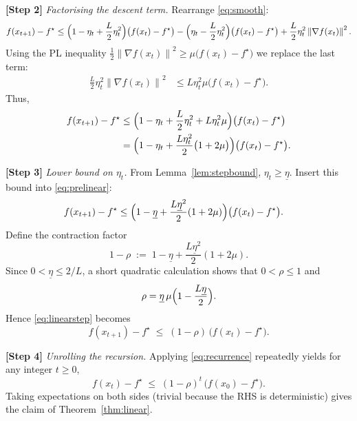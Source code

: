 \documentclass{article}
\newcommand{\norm}[1]{\left\lVert #1 \right\rVert}
\begin{document}
\noindent\textbf{[Step 2]} \emph{Factorising the descent term.}  
Rearrange \eqref{eq:smooth}:
\begin{equation}
f(x_{t+1})-f^{\star}
\le \Bigl(1-\eta_{t}+\frac{L}{2}\eta_{t}^{2}\Bigr)\bigl(f(x_{t})-f^{\star}\bigr)
    -\Bigl(\eta_{t}-\frac{L}{2}\eta_{t}^{2}\Bigr)
        \bigl(f(x_{t})-f^{\star}\bigr)
        +\frac{L}{2}\eta_{t}^{2}\norm{\nabla f(x_{t})}^{2}.
\end{equation}
Using the PL inequality $\frac12\norm{\nabla f(x_{t})}^{2}\ge\mu\bigl(f(x_{t})-f^{\star}\bigr)$ we replace the last term:
\begin{align}
\frac{L}{2}\eta_{t}^{2}\norm{\nabla f(x_{t})}^{2}
&\le L\eta_{t}^{2}\mu\bigl(f(x_{t})-f^{\star}\bigr).
\end{align}
Thus,
\begin{align}
f(x_{t+1})-f^{\star}
&\le \Bigl(1-\eta_{t}+\frac{L}{2}\eta_{t}^{2}+L\eta_{t}^{2}\mu\Bigr)
        \bigl(f(x_{t})-f^{\star}\bigr) \nonumber\\
&= \Bigl(1-\eta_{t}+\frac{L\eta_{t}^{2}}{2}\bigl(1+2\mu\bigr)\Bigr)
        \bigl(f(x_{t})-f^{\star}\bigr).
\label{eq:prelinear}
\end{align}

\noindent\textbf{[Step 3]} \emph{Lower bound on $\eta_{t}$.}  
From Lemma~\ref{lem:stepbound}, $\eta_{t}\ge\underline{\eta}$. Insert this bound into \eqref{eq:prelinear}:
\begin{align}
f(x_{t+1})-f^{\star}
&\le \Bigl(1-\underline{\eta}+\frac{L\underline{\eta}^{2}}{2}(1+2\mu)\Bigr)
        \bigl(f(x_{t})-f^{\star}\bigr).\label{eq:linearstep}
\end{align}
Define the contraction factor
\[
1-\rho \;:=\; 1-\underline{\eta}+\frac{L\underline{\eta}^{2}}{2}(1+2\mu).
\]
Since $0<\underline{\eta}\le 2/L$, a short quadratic calculation shows that $0<\rho\le 1$ and
\[
\rho = \underline{\eta}\,\mu\Bigl(1-\frac{L\underline{\eta}}{2}\Bigr).
\]
Hence \eqref{eq:linearstep} becomes
\begin{equation}
f(x_{t+1})-f^{\star}\;\le\;(1-\rho)\,\bigl(f(x_{t})-f^{\star}\bigr).
\label{eq:recurrence}
\end{equation}

\noindent\textbf{[Step 4]} \emph{Unrolling the recursion.}  
Applying \eqref{eq:recurrence} repeatedly yields for any integer $t\ge0$,
\[
f(x_{t})-f^{\star}\;\le\;(1-\rho)^{t}\,\bigl(f(x_{0})-f^{\star}\bigr).
\]
Taking expectations on both sides (trivial because the RHS is deterministic) gives the claim of Theorem~\ref{thm:linear}.
\end{document}
